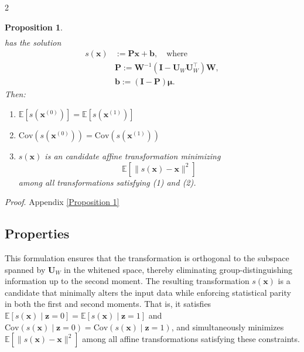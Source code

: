 \documentclass[ecta,nameyear,final]{econsocart}
\numberwithin{equation}{section}
\theoremstyle{plain}
\newtheorem{proposition}{Proposition}
\theoremstyle{definition}
\begin{document}
\begin{multicols}{2}
\begin{proposition}
\begin{align*}
    \end{align*}
    has the solution
    \begin{align*}
        s(\mathbf{x}) &:= \mathbf{P} \mathbf{x} + \mathbf{b}, \quad \text{where} \\ 
        &\mathbf{P} := \mathbf{W}^{-1} (\mathbf{I} - \mathbf{U}_W \mathbf{U}_W^\top) \mathbf{W},\\ 
        &\mathbf{b} := (\mathbf{I} - \mathbf{P}) \boldsymbol{\mu}.
    \end{align*}
    Then:
    \begin{enumerate}
        \item $\mathbb{E}[s(\mathbf{x}^{(0)})] = \mathbb{E}[s(\mathbf{x}^{(1)})]$
        \item $\text{Cov}(s(\mathbf{x}^{(0)})) = \text{Cov}(s(\mathbf{x}^{(1)}))$
        \item $s(\mathbf{x})$ is an candidate affine transformation minimizing 
        $$
        \mathbb{E}[\|s(\mathbf{x}) - \mathbf{x}\|^2]
        $$
        among all transformations satisfying (1) and (2).
    \end{enumerate}
\end{proposition}
\emph{Proof}. Appendix \ref{Proposition 1}
\subsection{Properties}
This formulation ensures that the transformation is orthogonal to the subspace spanned by $\mathbf{U}_W$ in the whitened space, thereby eliminating group-distinguishing information up to the second moment.
\newline \newline
The resulting transformation $s(\mathbf{x})$ is a candidate that minimally alters the input data while enforcing statistical parity in both the first and second moments. 
\newline \newline
That is, it satisfies $\mathbb{E}[s(\mathbf{x}) \mid \mathbf{z}=0] = \mathbb{E}[s(\mathbf{x}) \mid \mathbf{z}=1]$ and $\text{Cov}(s(\mathbf{x}) \mid \mathbf{z}=0) = \text{Cov}(s(\mathbf{x}) \mid \mathbf{z}=1)$, and simultaneously minimizes $\mathbb{E}[\|s(\mathbf{x}) - \mathbf{x}\|^2]$ among all affine transformations satisfying these constraints.

\end{multicols}
\end{document}
